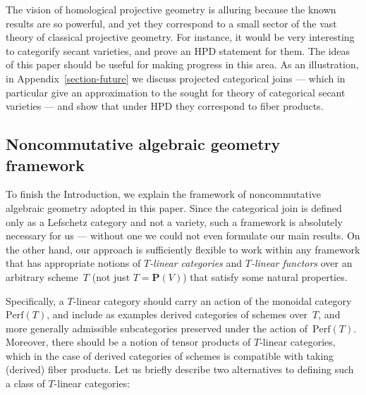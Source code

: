 \documentclass[11pt, reqno]{amsart}
\numberwithin{equation}{section}
\theoremstyle{plain}
\theoremstyle{definition}
\newcommand{\Perf}{\mathrm{Perf}}
\newcommand{\bP}{\mathbf{P}}
\begin{document}
The vision of homological projective geometry is alluring  
because the known results are so powerful, 
and yet they correspond to a small sector of the vast theory of 
classical projective geometry. 
For instance, it would be very interesting to categorify secant varieties, 
and prove an HPD statement for them. 
The ideas of this paper should be useful for making progress in this area. 
As an illustration, in Appendix~\ref{section-future} we discuss projected categorical joins --- 
which in particular give an approximation to the sought for theory of categorical secant varieties --- 
and show that under HPD they correspond to fiber products. 

\subsection{Noncommutative algebraic geometry framework}
\label{ss:intro-cat-framework}

To finish the Introduction, we explain the framework of noncommutative algebraic geometry adopted in this paper. 
Since the categorical join is defined only as a Lefschetz category and not a variety, 
such a framework is absolutely necessary for us --- without one we could not even formulate our main results. 
On the other hand, our approach is sufficiently flexible to work within any framework 
that has appropriate notions of \emph{$T$-linear categories} and \emph{$T$-linear functors} over an arbitrary scheme~$T$ (not just $T = \bP(V)$)
that satisfy some natural properties.

Specifically, a $T$-linear category should carry an action of the monoidal category~$\Perf(T)$, 
and include as examples derived categories of schemes over~$T$, 
and more generally admissible subcategories preserved under the action of~$\Perf(T)$. 
Moreover, there should be a notion of tensor products of $T$-linear categories, which 
in the case of derived categories of schemes is compatible with taking (derived) fiber products. 
Let us briefly describe two alternatives to defining such a class of $T$-linear categories: 
\end{document}
